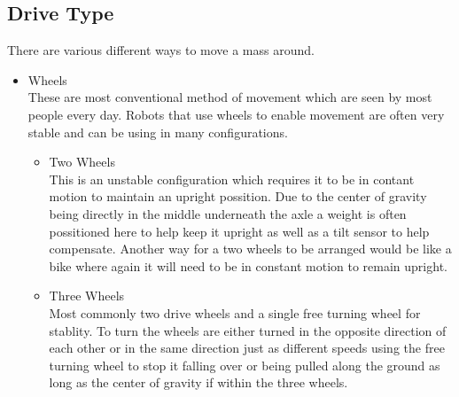 \subsection{Drive Type}
There are various different ways to move a mass around.
\begin{itemize}
\item Wheels
\\These are most conventional method of movement which are seen by most people every day.  Robots that use wheels to enable movement are often very stable and can be using in many configurations.
	\begin{itemize}
	\item Two Wheels
	\\This is an unstable configuration which requires it to be in contant motion to maintain an upright possition.  Due to the center of gravity being directly in the middle underneath the axle a weight is often possitioned here to help keep it upright as well as a tilt sensor to help compensate.  Another way for a two wheels to be arranged would be like a bike where again it will need to be in constant motion to remain upright.

	\item Three Wheels
	\\Most commonly two drive wheels and a single free turning wheel for stablity.  To turn the wheels are either turned in the opposite direction of each other or in the same direction just as different speeds using the free turning wheel to stop it falling over or being pulled along the ground as long as the center of gravity if within the three wheels.


\end{itemize}
\end{itemize}
